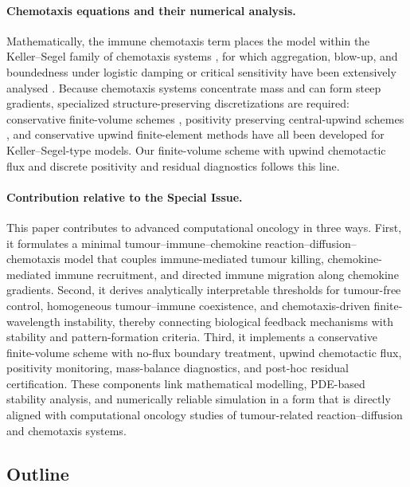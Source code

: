 \documentclass[a4paper,fleqn,longmktitle]{cas-sc}
\theoremstyle{plain}
\theoremstyle{definition}
\numberwithin{equation}{section}
\begin{document}
\paragraph{Chemotaxis equations and their numerical analysis.}
Mathematically, the immune chemotaxis term places the model within the
Keller--Segel family of chemotaxis systems \cite{keller1970initiation,hillen2009user,wang2025analysis,horstmann20031970},
for which aggregation, blow-up, and boundedness under logistic damping or critical
sensitivity have been extensively analysed \cite{winkler2010aggregation,tao2012boundedness,wang2026damage,arumugam2021keller}.
Because chemotaxis systems concentrate mass and can form steep gradients,
specialized structure-preserving discretizations are required: conservative
finite-volume schemes \cite{filbet2006finite}, positivity
preserving central-upwind schemes \cite{chertock2008second,yu2026age}, and conservative
upwind finite-element methods \cite{saito2007conservative} have all been developed for
Keller--Segel-type models. Our finite-volume scheme with upwind chemotactic flux
and discrete positivity and residual diagnostics follows this line.

\paragraph{Contribution relative to the Special Issue.}
This paper contributes to advanced computational oncology in three ways. First,
it formulates a minimal tumour--immune--chemokine
reaction--diffusion--chemotaxis model that couples immune-mediated tumour
killing, chemokine-mediated immune recruitment, and directed immune migration
along chemokine gradients. Second, it derives analytically interpretable
thresholds for tumour-free control, homogeneous tumour--immune coexistence, and
chemotaxis-driven finite-wavelength instability, thereby connecting biological
feedback mechanisms with stability and pattern-formation criteria. Third, it
implements a conservative finite-volume scheme with no-flux boundary treatment,
upwind chemotactic flux, positivity monitoring, mass-balance diagnostics, and
post-hoc residual certification. These components link mathematical modelling,
PDE-based stability analysis, and numerically reliable simulation in a form that
is directly aligned with computational oncology studies of tumour-related
reaction--diffusion and chemotaxis systems.

\subsection{Outline}
\label{subsec:outline}
\end{document}
